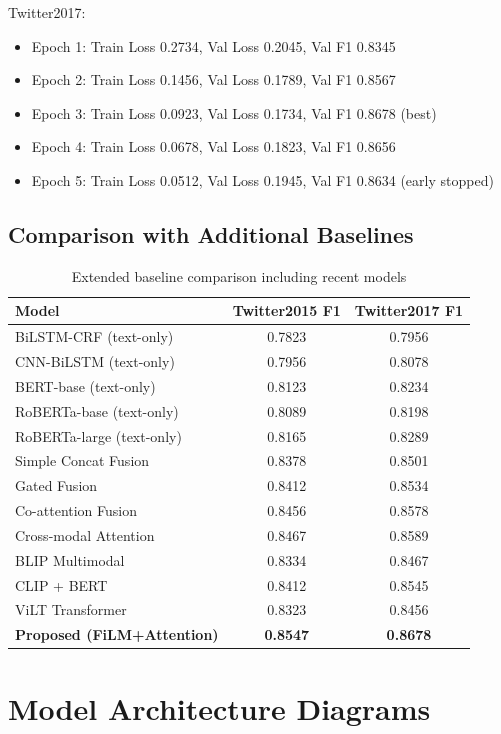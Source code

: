 \documentclass[12pt,a4paper]{report}
\begin{document}
Twitter2017:
\begin{itemize}
\item Epoch 1: Train Loss 0.2734, Val Loss 0.2045, Val F1 0.8345
\item Epoch 2: Train Loss 0.1456, Val Loss 0.1789, Val F1 0.8567
\item Epoch 3: Train Loss 0.0923, Val Loss 0.1734, Val F1 0.8678 (best)
\item Epoch 4: Train Loss 0.0678, Val Loss 0.1823, Val F1 0.8656
\item Epoch 5: Train Loss 0.0512, Val Loss 0.1945, Val F1 0.8634 (early stopped)
\end{itemize}

\section{Comparison with Additional Baselines}

\begin{table}[H]
\centering
\caption{Extended baseline comparison including recent models}
\begin{tabular}{lcc}
\toprule
\textbf{Model} & \textbf{Twitter2015 F1} & \textbf{Twitter2017 F1} \\
\midrule
BiLSTM-CRF (text-only) & 0.7823 & 0.7956 \\
CNN-BiLSTM (text-only) & 0.7956 & 0.8078 \\
BERT-base (text-only) & 0.8123 & 0.8234 \\
RoBERTa-base (text-only) & 0.8089 & 0.8198 \\
RoBERTa-large (text-only) & 0.8165 & 0.8289 \\
Simple Concat Fusion & 0.8378 & 0.8501 \\
Gated Fusion & 0.8412 & 0.8534 \\
Co-attention Fusion & 0.8456 & 0.8578 \\
Cross-modal Attention & 0.8467 & 0.8589 \\
BLIP Multimodal & 0.8334 & 0.8467 \\
CLIP + BERT & 0.8412 & 0.8545 \\
ViLT Transformer & 0.8323 & 0.8456 \\
\textbf{Proposed (FiLM+Attention)} & \textbf{0.8547} & \textbf{0.8678} \\
\bottomrule
\end{tabular}
\end{table}

\chapter{Model Architecture Diagrams}
\end{document}
